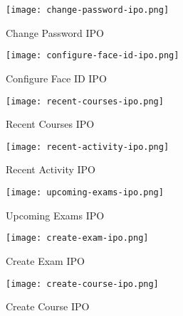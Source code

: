 \pagebreak

\begin{figure}[h!]
    \begin{center}
        \texttt{[image: change-password-ipo.png]}
        \caption{Change Password IPO}
    \end{center}
\end{figure}

\begin{figure}[h!]
    \begin{center}
        \texttt{[image: configure-face-id-ipo.png]}
        \caption{Configure Face ID IPO}
    \end{center}
\end{figure}

\begin{figure}[h!]
    \begin{center}
        \texttt{[image: recent-courses-ipo.png]}
        \caption{Recent Courses IPO}
    \end{center}
\end{figure}

\pagebreak

\begin{figure}[h!]
    \begin{center}
        \texttt{[image: recent-activity-ipo.png]}
        \caption{Recent Activity IPO}
    \end{center}
\end{figure}

\begin{figure}[h!]
    \begin{center}
        \texttt{[image: upcoming-exams-ipo.png]}
        \caption{Upcoming Exams IPO}
    \end{center}
\end{figure}

\begin{figure}[h!]
    \begin{center}
        \texttt{[image: create-exam-ipo.png]}
        \caption{Create Exam IPO}
    \end{center}
\end{figure}

\pagebreak

\begin{figure}[h!]
    \begin{center}
        \texttt{[image: create-course-ipo.png]}
        \caption{Create Course IPO}
    \end{center}
\end{figure}

